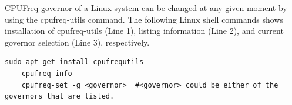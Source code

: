 CPUFreq governor of a Linux system can be changed at any given moment by using the cpufreq-utils command. The following Linux shell commands shows installation of cpufreq-utils (Line 1), listing information (Line 2), and current governor selection (Line 3), respectively.
\begin{lstlisting}[style=bash]
	sudo apt-get install cpufrequtils
	cpufreq-info
	cpufreq-set -g <governor>  #<governor> could be either of the governors that are listed.
\end{lstlisting}


